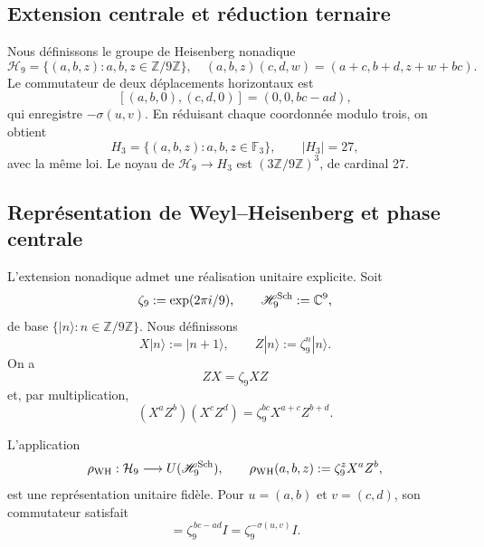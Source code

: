 \subsection{Extension centrale et réduction ternaire}

Nous définissons le groupe de Heisenberg nonadique
\begin{equation}
 \mathcal H_9=\{(a,b,z):a,b,z\in\mathbb Z/9\mathbb Z\},
 \quad
 (a,b,z)(c,d,w)=(a+c,b+d,z+w+bc).
 \label{x_reciprocidad:p12-83-c20-s6:eq:heisenberg-9-nuevo}
\end{equation}
Le commutateur de deux déplacements horizontaux est
\[
 [(a,b,0),(c,d,0)]=(0,0,bc-ad),
\]
qui enregistre \(-\sigma(u,v)\). En réduisant chaque coordonnée modulo trois, on
obtient
\begin{equation}
 H_3=\{(a,b,z):a,b,z\in\mathbb F_3\},\qquad |H_3|=27,
 \label{x_reciprocidad:p12-83-c20-s6:eq:heisenberg-3-nuevo}
\end{equation}
avec la même loi. Le noyau de \(\mathcal H_9\to H_3\) est \((3\mathbb Z/9\mathbb Z)^3\), de cardinal 27.

\subsection{Représentation de Weyl--Heisenberg et phase centrale}

L’extension nonadique admet une réalisation unitaire explicite. Soit
\[
 \zeta_9:=\exp(2\pi i/9),
 \qquad
 \mathscr H_9^{\rm Sch}:=\mathbb C^9,
\]
de base \(\{|n\rangle:n\in\mathbb Z/9\mathbb Z\}\). Nous définissons
\begin{equation}
 X|n\rangle:=|n+1\rangle,
 \qquad
 Z|n\rangle:=\zeta_9^n|n\rangle.
 \label{x_reciprocidad:p12-83-c20-s6:eq:weyl-desplazamiento-fase-u029}
\end{equation}
On a
\[
 ZX=\zeta_9XZ
\]
et, par multiplication,
\begin{equation}
 (X^aZ^b)(X^cZ^d)
 =\zeta_9^{bc}X^{a+c}Z^{b+d}.
 \label{x_reciprocidad:p12-83-c20-s6:eq:cociclo-weyl-nonadico-u029}
\end{equation}

\begin{theorem}
\label{x_reciprocidad:p12-83-c20-s6:thm:representacion-weyl-heisenberg-u029}
L'application
\begin{equation}
 \rho_{\rm WH}:\mathcal H_9\longrightarrow
 U(\mathscr H_9^{\rm Sch}),
 \qquad
 \rho_{\rm WH}(a,b,z):=\zeta_9^zX^aZ^b,
 \label{x_reciprocidad:p12-83-c20-s6:eq:representacion-weyl-heisenberg-u029}
\end{equation}
est une représentation unitaire fidèle. Pour
\(u=(a,b)\) et \(v=(c,d)\), son commutateur satisfait
\begin{equation}
 [\rho_{\rm WH}(u,0),\rho_{\rm WH}(v,0)]
 =\zeta_9^{\,bc-ad}I
 =\zeta_9^{-\sigma(u,v)}I.
 \label{x_reciprocidad:p12-83-c20-s6:eq:conmutador-weyl-holonomia-u029}
\end{equation}
\end{theorem}

